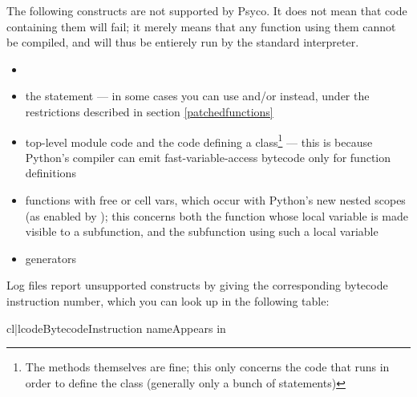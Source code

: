 \documentclass{manual}
\begin{document}
The following constructs are not supported by Psyco.  It does not mean that code containing them will fail; it merely means that any function using them cannot be compiled, and will thus be entierely run by the standard interpreter.

\begin{itemize}

\item {}

\item the  statement --- in some cases you can use  and/or  instead, under the restrictions described in section \ref{patchedfunctions}

\item top-level module code and the code defining a class\footnote{The methods themselves are fine; this only concerns the code that runs in order to define the class (generally only a bunch of  statements)} --- this is because Python's compiler can emit fast-variable-access bytecode only for function definitions

\item functions with free or cell vars, which occur with Python's new nested scopes (as enabled by ); this concerns both the function whose local variable is made visible to a subfunction, and the subfunction using such a local variable

\item generators

\end{itemize}

Log files report unsupported constructs by giving the corresponding bytecode instruction number, which you can look up in the following table:

\begin{tableiii}{cl|l}{code}{Bytecode}{Instruction name}{Appears in}
\end{tableiii}
\end{document}

